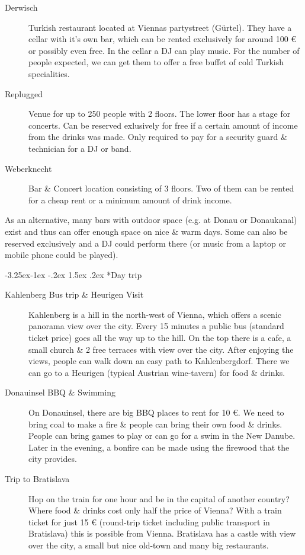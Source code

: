 \documentclass[10pt,a4paper]{article}
\makeatletter
\renewcommand\subsection{%
\@startsection{subsection}{2}{\z@}%
              {-3.25ex\@plus -1ex \@minus -.2ex}%
              {1.5ex \@plus .2ex}%
              {\color{kdelight}\sffamily\Large\bfseries}}
\makeatother
\begin{document}
\begin{description}
\item[\color{kdedarker} Derwisch] Turkish restaurant located at Viennas partystreet (Gürtel). They have a cellar with it's own bar, which can be rented exclusively for around 100 \euro{} or possibly even free. In the cellar a DJ can play music. For the number of people expected, we can get them to offer a free buffet of cold Turkish specialities. 
\item[\color{kdedarker} Replugged] Venue for up to 250 people with 2 floors. The lower floor has a stage for concerts. Can be reserved exlusively for free if a certain amount of income from the drinks was made. Only required to pay for a security guard \& technician for a DJ or band.
\item[\color{kdedarker} Weberknecht] Bar \& Concert location consisting of 3 floors. Two of them can be rented for a cheap rent or a minimum amount of drink income.
\end{description}

As an alternative, many bars with outdoor space (e.g. at Donau or Donaukanal) exist and thus can offer enough space on nice \& warm days. Some can also be reserved exclusively and a DJ could perform there (or music from a laptop or mobile phone could be played).


\subsection*{Day trip}
\begin{description}
\item[\color{kdedarker} Kahlenberg Bus trip \& Heurigen Visit] Kahlenberg is a hill in the north-west of Vienna, which offers a scenic panorama view over the city. Every 15 minutes a public bus (standard ticket price) goes all the way up to the hill. On the top there is a cafe, a small church \& 2 free terraces with view over the city. After enjoying the views, people can walk down an easy path to Kahlenbergdorf. There we can go to a Heurigen (typical Austrian wine-tavern) for food \& drinks.
\item[\color{kdedarker} Donauinsel BBQ \& Swimming] On Donauinsel, there are big BBQ places to rent for 10 \euro{}. We need to bring coal to make a fire \& people can bring their own food \& drinks. People can bring games to play or can go for a swim in the New Danube. Later in the evening, a bonfire can be made using the firewood that the city provides.
\item[\color{kdedarker} Trip to Bratislava] Hop on the train for one hour and be in the capital of another country? Where food \& drinks cost only half the price of Vienna? With a train ticket for just 15 \euro{} (round-trip ticket including public transport in Bratislava) this is possible from Vienna. Bratislava has a castle with view over the city, a small but nice old-town and many big restaurants.
\end{description}
\end{document}
